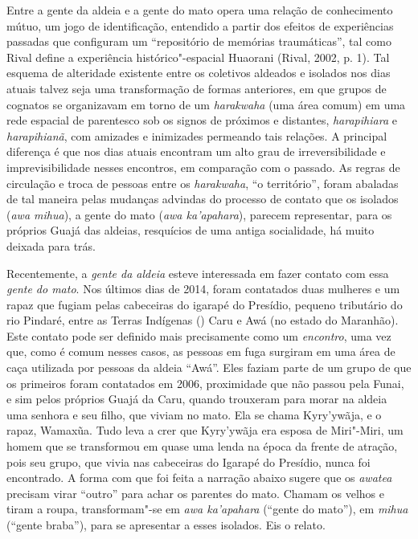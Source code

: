 Entre a gente da aldeia e a gente do mato opera uma relação de
conhecimento mútuo, um jogo de identificação, entendido a partir dos
efeitos de experiências passadas que configuram um ``repositório de
memórias traumáticas'', tal como Rival define a experiência
histórico"-espacial Huaorani (Rival, 2002, p. 1). Tal esquema de alteridade
existente entre os coletivos aldeados e isolados nos dias atuais talvez
seja uma transformação de formas anteriores, em que grupos de cognatos
se organizavam em torno de um \emph{harakwaha} (uma área comum) em uma
rede espacial de parentesco sob os signos de próximos e distantes,
\emph{harapihiara} e \emph{harapihianã}, com amizades e inimizades
permeando tais relações. A principal diferença é que nos dias atuais
encontram um alto grau de irreversibilidade e imprevisibilidade nesses
encontros, em comparação com o passado. As regras de circulação e troca
de pessoas entre os \emph{harakwaha}, ``o território'', foram abaladas de
tal maneira pelas mudanças advindas do processo de contato que os
isolados (\emph{awa mihua}), a gente do mato (\emph{awa ka'apahara}),
parecem representar, para os próprios Guajá das aldeias, resquícios de
uma antiga socialidade, há muito deixada para trás.

Recentemente, a \emph{gente da aldeia} esteve interessada em fazer
contato com essa \emph{gente do mato}. Nos últimos dias de 2014, foram
contatados duas mulheres e um rapaz que fugiam pelas cabeceiras do
igarapé do Presídio, pequeno tributário do rio Pindaré, entre as Terras
Indígenas () Caru e Awá (no estado do Maranhão). Este contato pode ser
definido mais precisamente como um \emph{encontro}, uma vez que, como é
comum nesses casos, as pessoas em fuga surgiram em uma área de caça
utilizada por pessoas da aldeia ``Awá''. Eles faziam parte de um grupo
de que os primeiros foram contatados em 2006, proximidade que não passou
pela Funai, e sim pelos próprios Guajá da  Caru, quando trouxeram para
morar na aldeia uma senhora e seu filho, que viviam no mato. Ela se
chama Kyry'ywãja, e o rapaz, Wamaxũa. Tudo leva a crer que Kyry'ywãja
era esposa de Miri"-Miri, um homem que se transformou em quase uma lenda
na época da frente de atração, pois seu grupo, que vivia nas cabeceiras
do Igarapé do Presídio, nunca foi encontrado. A forma com que foi feita
a narração abaixo sugere que os \emph{awatea} precisam virar ``outro''
para achar os parentes do mato. Chamam os velhos e tiram a roupa,
transformam"-se em \emph{awa ka'apahara} (``gente do mato''), em
\emph{mihua} (``gente braba''), para se apresentar a esses isolados. Eis
o relato.

